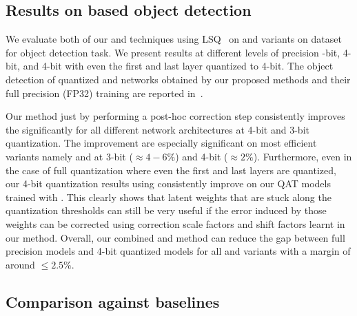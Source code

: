 \subsection{Results on \yolo{} based object detection}

We evaluate both of our \exma{} and \qc{} techniques using \acrshort{LSQ}~\cite{lsq} on \yoloa{} and \yolob{} variants on \coco{} dataset for object detection task. We present results at different levels of precision -bit, 4-bit, and 4-bit with even the first and last layer quantized to 4-bit. The object detection of quantized \yoloa{} and \yolob{} networks obtained by our proposed methods and their full precision (FP32) training are reported in~. 


Our \qc{} method just by performing a post-hoc correction step consistently improves the \exma{} significantly for all different network architectures at 4-bit and 3-bit quantization. The improvement are especially significant on most efficient variants namely  and  at 3-bit ($\approx4-6\%$) and 4-bit ($\approx2\%$). Furthermore, even in the case of full quantization where even the first and last layers are quantized, our 4-bit quantization results using \qc{} consistently improve on our \acrshort{QAT} models trained with \exma{}. This clearly shows that latent weights that are stuck along the quantization thresholds can still be very useful if the error induced by those weights can be corrected using correction scale factors and shift factors learnt in our \qc{} method. Overall, our combined \exma{} and \qc{} method can reduce the gap between full precision models and 4-bit quantized models for all \yoloa{} and \yolob{} variants with a margin of around $\le 2.5\%$.


\subsection{Comparison against baselines}



